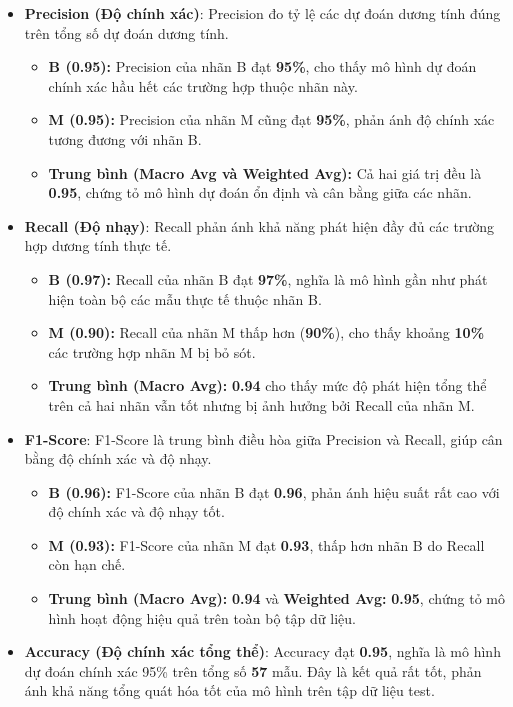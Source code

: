 \begin{itemize}
	\item \textbf{Precision (Độ chính xác)}:  
	Precision đo tỷ lệ các dự đoán dương tính đúng trên tổng số dự đoán dương tính.
	\begin{itemize}
		\item \textbf{B (0.95):} Precision của nhãn B đạt \textbf{95\%}, cho thấy mô hình dự đoán chính xác hầu hết các trường hợp thuộc nhãn này.
		\item \textbf{M (0.95):} Precision của nhãn M cũng đạt \textbf{95\%}, phản ánh độ chính xác tương đương với nhãn B.
		\item \textbf{Trung bình (Macro Avg và Weighted Avg):} Cả hai giá trị đều là \textbf{0.95}, chứng tỏ mô hình dự đoán ổn định và cân bằng giữa các nhãn.
	\end{itemize}
	
	\item \textbf{Recall (Độ nhạy)}:  
	Recall phản ánh khả năng phát hiện đầy đủ các trường hợp dương tính thực tế.
	\begin{itemize}
		\item \textbf{B (0.97):} Recall của nhãn B đạt \textbf{97\%}, nghĩa là mô hình gần như phát hiện toàn bộ các mẫu thực tế thuộc nhãn B.
		\item \textbf{M (0.90):} Recall của nhãn M thấp hơn (\textbf{90\%}), cho thấy khoảng \textbf{10\%} các trường hợp nhãn M bị bỏ sót.  
		\item \textbf{Trung bình (Macro Avg):} \textbf{0.94} cho thấy mức độ phát hiện tổng thể trên cả hai nhãn vẫn tốt nhưng bị ảnh hưởng bởi Recall của nhãn M.
	\end{itemize}
	
	\item \textbf{F1-Score}:  
	F1-Score là trung bình điều hòa giữa Precision và Recall, giúp cân bằng độ chính xác và độ nhạy.
	\begin{itemize}
		\item \textbf{B (0.96):} F1-Score của nhãn B đạt \textbf{0.96}, phản ánh hiệu suất rất cao với độ chính xác và độ nhạy tốt.
		\item \textbf{M (0.93):} F1-Score của nhãn M đạt \textbf{0.93}, thấp hơn nhãn B do Recall còn hạn chế.
		\item \textbf{Trung bình (Macro Avg):} \textbf{0.94} và \textbf{Weighted Avg:} \textbf{0.95}, chứng tỏ mô hình hoạt động hiệu quả trên toàn bộ tập dữ liệu.
	\end{itemize}
	
	\item \textbf{Accuracy (Độ chính xác tổng thể)}:  
	Accuracy đạt \textbf{0.95}, nghĩa là mô hình dự đoán chính xác 95\% trên tổng số \textbf{57} mẫu. Đây là kết quả rất tốt, phản ánh khả năng tổng quát hóa tốt của mô hình trên tập dữ liệu test.
\end{itemize}

